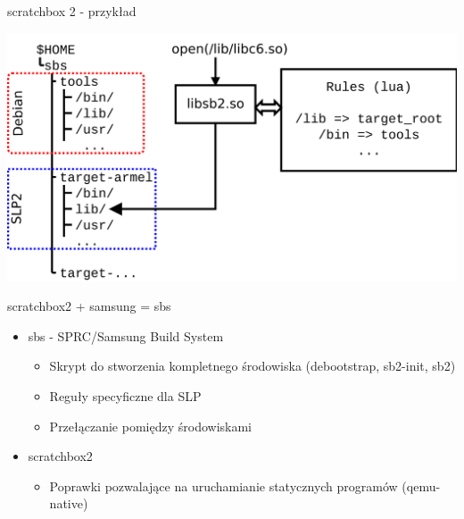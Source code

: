 \documentclass[presentation,aspectratio=43,12pt]{beamer}
\begin{document}
\begin{frame}[label=sec-3-8]{scratchbox 2 - przykład}
\begin{center}
\includegraphics[width=\textwidth]{images/sb2-3}
\end{center}
\end{frame}
\begin{frame}[label=sec-3-9]{scratchbox2 + samsung = sbs}
\begin{itemize}
\item sbs - SPRC/Samsung Build System
\begin{itemize}
\item Skrypt do stworzenia kompletnego środowiska (debootstrap, sb2-init, sb2)
\item Reguły specyficzne dla SLP
\item Przełączanie pomiędzy środowiskami
\end{itemize}
\end{itemize}

\pause

\begin{itemize}
\item scratchbox2
\begin{itemize}
\item Poprawki pozwalające na uruchamianie statycznych programów (qemu-native)
\end{itemize}
\end{itemize}
\end{frame}
\end{document}
